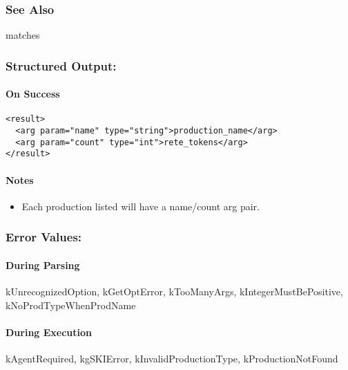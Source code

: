 \subsubsection*{See Also}
 matches
\subsubsection*{Structured Output:}
\paragraph*{On Success}
\begin{verbatim}
<result>
  <arg param="name" type="string">production_name</arg>
  <arg param="count" type="int">rete_tokens</arg>
</result>
\end{verbatim}
\paragraph*{Notes}
\begin{itemize}
\item  Each production listed will have a name/count arg pair. 
\end{itemize}
\subsubsection*{Error Values:}
\paragraph*{During Parsing}
 kUnrecognizedOption, kGetOptError, kTooManyArgs, kIntegerMustBePositive, kNoProdTypeWhenProdName
\paragraph*{During Execution}
 kAgentRequired, kgSKIError, kInvalidProductionType, kProductionNotFound
